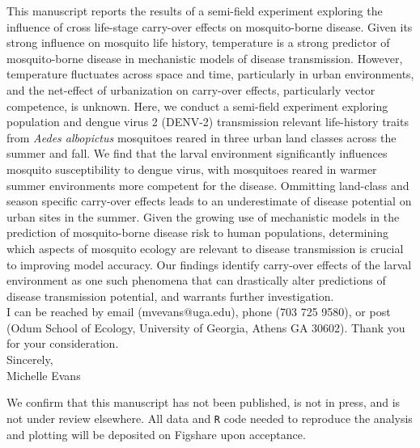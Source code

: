\documentclass{letter}
\begin{document}
\begin{letter}
This manuscript reports the results of a semi-field experiment exploring the influence of cross life-stage carry-over effects on mosquito-borne disease. Given its strong influence on mosquito life history, temperature is a strong predictor of mosquito-borne disease in mechanistic models of disease transmission. However, temperature fluctuates across space and time, particularly in urban environments, and the net-effect of urbanization on carry-over effects, particularly vector competence, is unknown. Here, we conduct a semi-field experiment exploring population and dengue virus 2 (DENV-2) transmission relevant life-history traits from \textit{Aedes albopictus} mosquitoes reared in three urban land classes across the summer and fall. We find that the larval environment significantly influences mosquito susceptibility to dengue virus, with mosquitoes reared in warmer summer environments more competent for the disease. Ommitting land-class and season specific carry-over effects leads to an underestimate of disease potential on urban sites in the summer. Given the growing use of mechanistic models in the prediction of mosquito-borne disease risk to human populations, determining which aspects of mosquito ecology are relevant to disease transmission is crucial to improving model accuracy. Our findings identify carry-over effects of the larval environment as one such phenomena that can drastically alter predictions of disease transmission potential, and warrants further investigation. \\

I can be reached by email (mvevans@uga.edu), phone (703 725 9580), or post (Odum School of Ecology, University of Georgia, Athens GA 30602). Thank you for your consideration. \\

Sincerely,\\
Michelle Evans

\vspace{1cm}

\footnotesize
We confirm that this manuscript has not been published, is not in press, and is not under review elsewhere. All data and \texttt{R} code needed to reproduce the analysis and plotting will be deposited on Figshare upon acceptance.



\end{letter}
\end{document}
